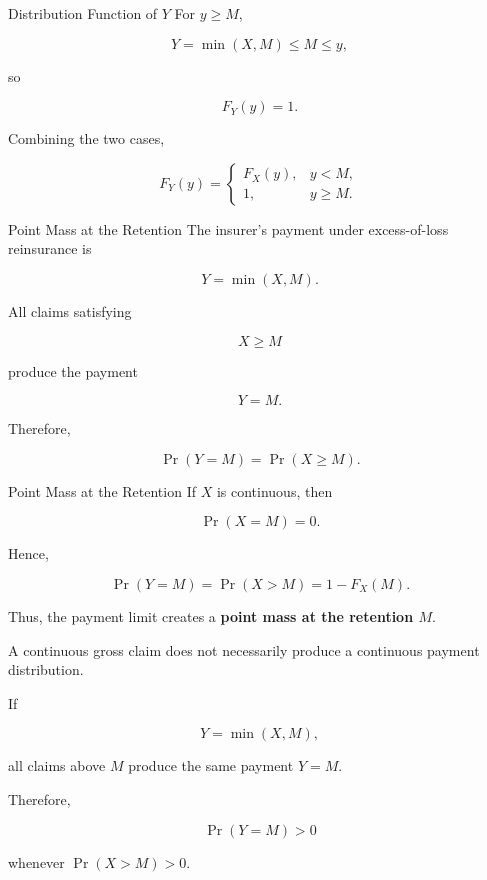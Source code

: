 \documentclass[
  ignorenonframetext,
  aspectratio=169,
]{beamer}
\begin{document}
\begin{frame}{Distribution Function of \(Y\)}
\protect{}\label{distribution-function-of-y-2}
For \(y\geq M\),

\[
Y=\min(X,M)\leq M\leq y,
\]

so

\[
F_Y(y)=1.
\]

Combining the two cases,

\[
\boxed{
F_Y(y)=
\begin{cases}
F_X(y), & y<M,\\
1, & y\geq M.
\end{cases}
}
\]
\end{frame}

\begin{frame}{Point Mass at the Retention}
\protect{}\label{point-mass-at-the-retention}
The insurer's payment under excess-of-loss reinsurance is

\[
Y=\min(X,M).
\]

All claims satisfying

\[
X\geq M
\]

produce the payment

\[
Y=M.
\]

Therefore,

\[
\Pr(Y=M)=\Pr(X\geq M).
\]
\end{frame}

\begin{frame}{Point Mass at the Retention}
\protect{}\label{point-mass-at-the-retention-1}
If \(X\) is continuous, then

\[
\Pr(X=M)=0.
\]

Hence,

\[
\boxed{
\Pr(Y=M)
=
\Pr(X>M)
=
1-F_X(M).
}
\]

Thus, the payment limit creates a \textbf{point mass at the retention
\(M\)}.
\end{frame}

\begin{frame}
\begin{tcolorbox}[enhanced jigsaw, arc=.35mm, bottomrule=.15mm, bottomtitle=1mm, breakable, colback=white, colbacktitle=quarto-callout-note-color!10!white, colframe=quarto-callout-note-color-frame, coltitle=black, left=2mm, leftrule=.75mm, opacityback=0, opacitybacktitle=0.6, rightrule=.15mm, title=\textcolor{quarto-callout-note-color}{\faInfo}\hspace{0.5em}{Key idea}, titlerule=0mm, toprule=.15mm, toptitle=1mm]

A continuous gross claim does not necessarily produce a continuous
payment distribution.

If

\[
Y=\min(X,M),
\]

all claims above \(M\) produce the same payment \(Y=M\).

Therefore,

\[
\Pr(Y=M)>0
\]

whenever \(\Pr(X>M)>0\).

\end{tcolorbox}
\end{frame}
\end{document}
